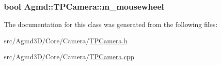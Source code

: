 \hypertarget{class_agmd_1_1_t_p_camera_abc20c2e9e998caf67f457504cb71401e}{
\subsubsection[{m\+\_\+mousewheel}]{\setlength{\rightskip}{0pt plus 5cm}bool Agmd\+::\+T\+P\+Camera\+::m\+\_\+mousewheel\hspace{0.3cm}{\ttfamily [protected]}}}\label{class_agmd_1_1_t_p_camera_abc20c2e9e998caf67f457504cb71401e}


The documentation for this class was generated from the following files\+:\begin{DoxyCompactItemize}
\item 
src/\+Agmd3\+D/\+Core/\+Camera/\hyperlink{_t_p_camera_8h}{T\+P\+Camera.\+h}\item 
src/\+Agmd3\+D/\+Core/\+Camera/\hyperlink{_t_p_camera_8cpp}{T\+P\+Camera.\+cpp}\end{DoxyCompactItemize}

